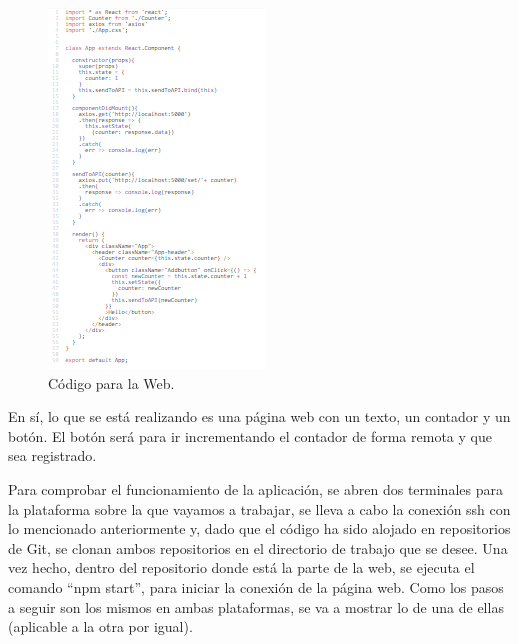 \documentclass[english,runningheads,a4paper]{llncs}[2018/03/10]
\begin{document}
\begin{figure}[h!]
 \includegraphics[width=\linewidth]{./Web/Azure/CodigoWeb1.png}
 \caption{Código para la Web.}
\end{figure}

En sí, lo que se está realizando es una página web con un texto, un contador y un
botón. El botón será para ir incrementando el contador de forma remota y que sea
registrado.

Para comprobar el funcionamiento de la aplicación, se abren dos terminales para la
plataforma sobre la que vayamos a trabajar, se lleva a cabo la conexión ssh con lo
mencionado anteriormente y, dado que el código ha sido alojado en repositorios de
Git, se clonan ambos repositorios en el directorio de trabajo que se desee. Una vez
hecho, dentro del repositorio donde está la parte de la web, se ejecuta el comando
“npm start”, para iniciar la conexión de la página web. Como los pasos a seguir son
los mismos en ambas plataformas, se va a mostrar lo de una de ellas (aplicable a la
otra por igual).
\end{document}

